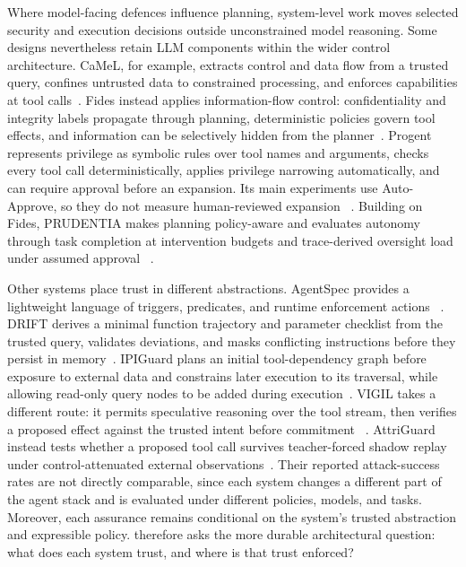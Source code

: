 Where model-facing defences influence planning, system-level work moves selected
security and execution decisions outside unconstrained model reasoning. Some
designs nevertheless retain LLM components within the wider control
architecture. CaMeL, for example, extracts control and data flow from a trusted
query, confines untrusted data to constrained processing, and enforces
capabilities at tool calls~\cite{debenedetti2025camel}. Fides instead applies
information-flow control: confidentiality and integrity labels propagate
through planning, deterministic policies govern tool effects, and information
can be selectively hidden from the planner~\cite{costa2025fides}. Progent
represents privilege as symbolic rules over tool names and arguments, checks
every tool call deterministically, applies privilege narrowing automatically,
and can require approval before an expansion. Its main experiments use
Auto-Approve, so they do not measure human-reviewed expansion
~\cite{shi2025progent}. Building on Fides, PRUDENTIA makes planning policy-aware
and evaluates autonomy through task completion at intervention budgets and
trace-derived oversight load under assumed approval
~\cite{kolluri2026prudentia}.

Other systems place trust in different abstractions. AgentSpec provides a
lightweight language of triggers, predicates, and runtime enforcement actions
~\cite{wang2026agentspec}. DRIFT derives a minimal function trajectory and
parameter checklist from the trusted query, validates deviations, and masks
conflicting instructions before they persist in memory~\cite{li2025drift}.
IPIGuard plans an initial tool-dependency graph before exposure to external data
and constrains later execution to its traversal, while allowing read-only query
nodes to be added during execution~\cite{an2025ipiguard}. VIGIL takes a
different route: it permits speculative reasoning over the tool stream, then
verifies a proposed effect against the trusted intent before commitment
~\cite{lin2026vigil}. AttriGuard instead tests whether a proposed tool call
survives teacher-forced shadow replay under control-attenuated external
observations~\cite{he2026attriguard}. Their reported attack-success rates are
not directly comparable, since each system changes a different part of the
agent stack and is evaluated under different policies, models, and tasks.
Moreover, each assurance remains conditional on the system's trusted
abstraction and expressible policy.  therefore asks
the more durable architectural question: what does each system trust, and where
is that trust enforced?

